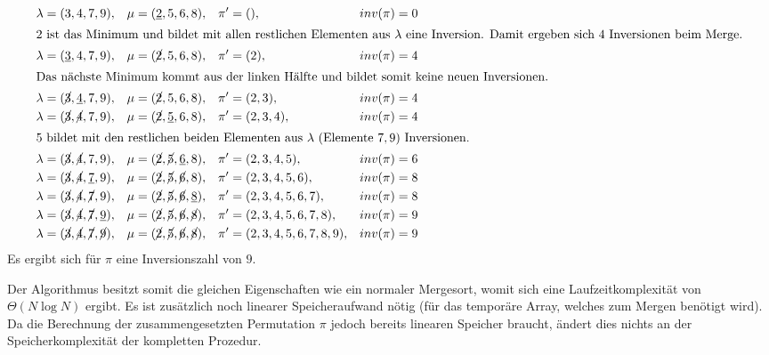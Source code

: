 \documentclass{whswinvcbook}
\begin{document}
\begin{align*}
    \lambda&=(3,4,7,9),&\mu&=(\underline{2},5,6,8),&\pi^\prime&=(),&inv(\pi)&=0\\
    \shortintertext{$2$ ist das Minimum und bildet mit allen restlichen Elementen aus $\lambda$ eine Inversion. Damit ergeben sich $4$ Inversionen beim Merge.}
    \lambda&=(\underline{3},4,7,9),&\mu&=(\cancel{2},5,6,8),&\pi^\prime&=(2),&inv(\pi)&=4\\
    \shortintertext{Das nächste Minimum kommt aus der linken Hälfte und bildet somit keine neuen Inversionen.}
    \lambda&=(\cancel{3},\underline{4},7,9),&\mu&=(\cancel{2},5,6,8),&\pi^\prime&=(2,3),&inv(\pi)&=4\\
    \lambda&=(\cancel{3},\cancel{4},7,9),&\mu&=(\cancel{2},\underline{5},6,8),&\pi^\prime&=(2,3,4),&inv(\pi)&=4\\
    \shortintertext{$5$ bildet mit den restlichen beiden Elementen aus $\lambda$ (Elemente $7,9$) Inversionen.}
    \lambda&=(\cancel{3},\cancel{4},7,9),&\mu&=(\cancel{2},\cancel{5},\underline{6},8),&\pi^\prime&=(2,3,4,5),&inv(\pi)&=6\\
    \lambda&=(\cancel{3},\cancel{4},\underline{7},9),&\mu&=(\cancel{2},\cancel{5},\cancel{6},8),&\pi^\prime&=(2,3,4,5,6),&inv(\pi)&=8\\
    \lambda&=(\cancel{3},\cancel{4},\cancel{7},9),&\mu&=(\cancel{2},\cancel{5},\cancel{6},\underline{8}),&\pi^\prime&=(2,3,4,5,6,7),&inv(\pi)&=8\\
    \lambda&=(\cancel{3},\cancel{4},\cancel{7},\underline{9}),&\mu&=(\cancel{2},\cancel{5},\cancel{6},\cancel{8}),&\pi^\prime&=(2,3,4,5,6,7,8),&inv(\pi)&=9\\
    \lambda&=(\cancel{3},\cancel{4},\cancel{7},\cancel{9}),&\mu&=(\cancel{2},\cancel{5},\cancel{6},\cancel{8}),&\pi^\prime&=(2,3,4,5,6,7,8,9),&inv(\pi)&=9
\end{align*}
Es ergibt sich für $\pi$ eine Inversionszahl von $9$.

Der Algorithmus besitzt somit die gleichen Eigenschaften wie ein normaler Mergesort, womit sich eine Laufzeitkomplexität von $\Theta(N\log N)$ ergibt. Es ist zusätzlich noch linearer Speicheraufwand nötig (für das temporäre Array, welches zum Mergen benötigt wird). Da die Berechnung der zusammengesetzten Permutation $\pi$ jedoch bereits linearen Speicher braucht, ändert dies nichts an der Speicherkomplexität der kompletten Prozedur.
\end{document}
